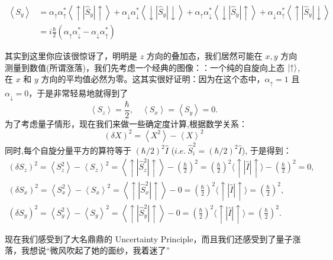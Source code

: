 \begin{equation}
	\begin{aligned}
		\left\langle S_y\right\rangle&=\alpha_{\uparrow}\alpha_{\uparrow}^*\left\langle\uparrow\left|\hat{S}_y\right|\uparrow\right\rangle+\alpha_{\downarrow}\alpha_{\downarrow}^*\left\langle\downarrow\left|\hat{S}_y\right|\downarrow\right\rangle+\alpha_{\uparrow}\alpha_{\downarrow}^*\left\langle\downarrow\left|\hat{S}_y\right|\uparrow\right\rangle+\alpha_{\downarrow}\alpha_{\uparrow}^*\left\langle\uparrow\left|\hat{S}_y\right|\downarrow\right\rangle\\
		&=i\frac{\hbar}{2}\left(\alpha_{\uparrow}\alpha_{\downarrow}^*-\alpha_{\downarrow}\alpha_{\uparrow}^*\right)
	\end{aligned}
\end{equation}

\par
其实到这里你应该很惊讶了，明明是 \(z\) 方向的叠加态，我们居然可能在 $x,y$ 方向测量到数值(所谓涨落)，我们先考虑一个经典的图像：：一个纯的自旋向上态 $\ket{\uparrow}$, 在 $x$ 和 $y$ 方向的平均值必然为零。这其实很好证明：因为在这个态中，$\alpha_{\uparrow}=1$ 且 $\alpha_{\downarrow}=0$，于是非常轻易地就得到了
\begin{equation}
	\left\langle S_z\right\rangle=\frac{\hbar}{2},\quad\left\langle S_x\right\rangle=\left\langle S_y\right\rangle=0.
\end{equation}
为了考虑量子情形，现在我们来做一些确定度计算,根据数学关系：
\begin{equation}
	{\left( {\delta X} \right)^2} = \left\langle {{X^2}} \right\rangle  - {\left\langle X \right\rangle ^2}
\end{equation}
同时,每个自旋分量平方的算符等于 $(\hbar/ 2)^{2}\hat{I}$ ($i.e.~\hat S_i^2 = (\hbar/ 2)^{2}\hat I$), 于是得到：
\begin{equation}
	\begin{gathered}
		\left(\delta S_z\right)^2=\left\langle S_z^2\right\rangle-\left\langle S_z\right\rangle^2=\left\langle\uparrow\left|\hat{S}_z^2\right|\uparrow\right\rangle-\left(\frac{\hbar}{2}\right)^2=\left(\frac{\hbar}{2}\right)^2\langle\uparrow|\hat{I}|\uparrow\rangle-\left(\frac{\hbar}{2}\right)^2=0,\\
		\left(\delta S_x\right)^2=\left\langle S_x^2\right\rangle-\left\langle S_x\right\rangle^2=\left\langle\uparrow\left|\hat{S}_x^2\right|\uparrow\right\rangle-0=\left(\frac{\hbar}{2}\right)^2\langle\uparrow|\hat{I}|\uparrow\rangle=\left(\frac{\hbar}{2}\right)^2,\\
		\left(\delta S_y\right)^2=\left\langle S_y^2\right\rangle-\left\langle S_y\right\rangle^2=\left\langle\uparrow\left|\hat{S}_y^2\right|\uparrow\right\rangle-0=\left(\frac{\hbar}{2}\right)^2\langle\uparrow|\hat{I}|\uparrow\rangle=\left(\frac{\hbar}{2}\right)^2.
	\end{gathered}
\end{equation}
\par
现在我们感受到了大名鼎鼎的 Uncertainty Principle，而且我们还感受到了量子涨落，我想说“微风吹起了她的面纱，我着迷了”


